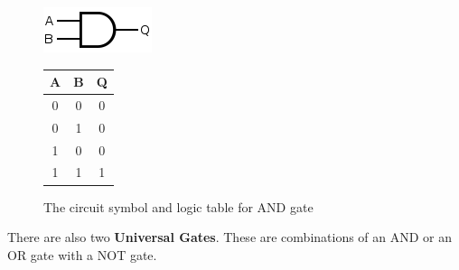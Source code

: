 \begin{itemize}
    \begin{figure}[H]
        \centering
        \includegraphics[width=0.30\columnwidth]{images/and.png}
        \qquad
        \begin{tabular}[b]{|c|c|c|}\hline
          A & B & Q \\ \hline
          0 & 0 & 0 \\ 
          0 & 1 & 0 \\
          1 & 0 & 0 \\
          1 & 1 & 1 \\ \hline
        \end{tabular}
        \caption{The circuit symbol and logic table for AND gate}
    \end{figure}
\end{itemize}

\noindent There are also two \textbf{Universal Gates}. These are combinations of an AND or an OR gate with a NOT gate.  

